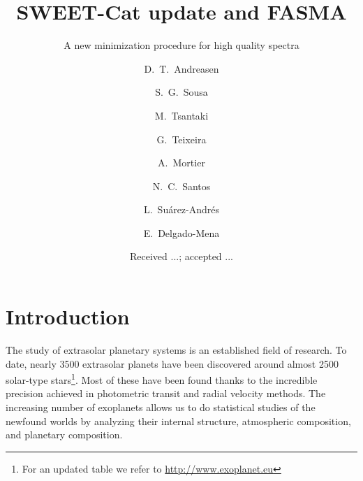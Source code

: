 \documentclass{aa}
\begin{document}
\title{SWEET-Cat update and FASMA}
\subtitle{A new minimization procedure for high quality spectra}


\author{ D.~T.~Andreasen
    \and S.~G.~Sousa
    \and M.~Tsantaki
    \and G.~Teixeira
    \and A.~Mortier
    \and N.~C.~Santos
    \and L.~Su\'arez-Andr\'es
    \and E.~Delgado-Mena
}







\date{Received ...; accepted ...}

\abstract
{}
{}
{}
{}
{}



\maketitle



\section{Introduction}
\label{sec:introduction}
The study of extrasolar planetary systems is an established field of research.
To date, nearly 3500 extrasolar planets have been discovered around almost 2500
solar-type stars\footnote{For an updated table we refer to
\url{http://www.exoplanet.eu}}. Most of these have been found thanks to the
incredible precision achieved in photometric transit and radial velocity
methods. The increasing number of exoplanets allows us to do statistical studies
of the newfound worlds by analyzing their internal structure, atmospheric
composition, and planetary composition.
\end{document}
